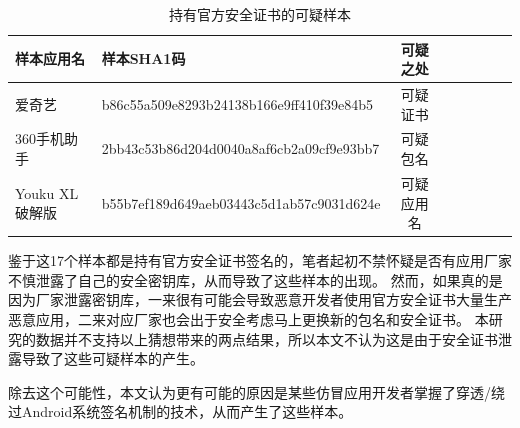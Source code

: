 \begin{table}[htbp]
    \renewcommand{\arraystretch}{1}
    \small
    \centering
  \setlength{\belowcaptionskip}{-10pt}
    \caption{持有官方安全证书的可疑样本}
    \begin{tabular}{l l c c c c c c}
        \toprule
        {\bf 样本应用名} & {\bf 样本SHA1码} & {\bf 可疑之处} \\
        \midrule
        爱奇艺 & b86c55a509e8293b24138b166e9ff410f39e84b5 & 可疑证书\\
        \rowcolor{gray!15} 360手机助手 & 2bb43c53b86d204d0040a8af6cb2a09cf9e93bb7 & 可疑包名\\
        Youku XL 破解版 & b55b7ef189d649aeb03443c5d1ab57c9031d624e & 可疑应用名 \\
        \bottomrule
    \end{tabular}
    \label{table:suspicious_samples}
\end{table}

鉴于这17个样本都是持有官方安全证书签名的，笔者起初不禁怀疑是否有应用厂家不慎泄露了自己的安全密钥库，从而导致了这些样本的出现。
然而，如果真的是因为厂家泄露密钥库，一来很有可能会导致恶意开发者使用官方安全证书大量生产恶意应用，二来对应厂家也会出于安全考虑马上更换新的包名和安全证书。
本研究的数据并不支持以上猜想带来的两点结果，所以本文不认为这是由于安全证书泄露导致了这些可疑样本的产生。

除去这个可能性，本文认为更有可能的原因是某些仿冒应用开发者掌握了穿透/绕过Android系统签名机制的技术，从而产生了这些样本。

